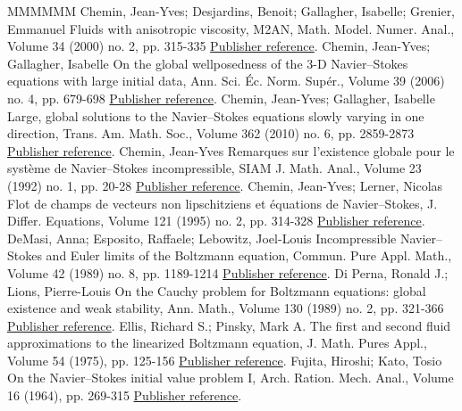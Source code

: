 \begin{thebibliography}{MMMMMM}
 Chemin, Jean-Yves; Desjardins, Benoit; Gallagher, Isabelle; Grenier, Emmanuel Fluids with anisotropic viscosity, M2AN, Math. Model. Numer. Anal., Volume 34 (2000) no. 2, pp. 315-335 \href{https://ahl.centre-mersenne.org/item/AHL_2020__3__561_0/#CDGG}{Publisher reference}.
 Chemin, Jean-Yves; Gallagher, Isabelle On the global wellposedness of the 3-D Navier–Stokes equations with large initial data, Ann. Sci. Éc. Norm. Supér., Volume 39 (2006) no. 4, pp. 679-698 \href{https://ahl.centre-mersenne.org/item/AHL_2020__3__561_0/#cg1}{Publisher reference}.
 Chemin, Jean-Yves; Gallagher, Isabelle Large, global solutions to the Navier–Stokes equations slowly varying in one direction, Trans. Am. Math. Soc., Volume 362 (2010) no. 6, pp. 2859-2873 \href{https://ahl.centre-mersenne.org/item/AHL_2020__3__561_0/#cg}{Publisher reference}.
 Chemin, Jean-Yves Remarques sur l’existence globale pour le système de Navier–Stokes incompressible, SIAM J. Math. Anal., Volume 23 (1992) no. 1, pp. 20-28 \href{https://ahl.centre-mersenne.org/item/AHL_2020__3__561_0/#cheminSIAM}{Publisher reference}.
 Chemin, Jean-Yves; Lerner, Nicolas Flot de champs de vecteurs non lipschitziens et équations de Navier–Stokes, J. Differ. Equations, Volume 121 (1995) no. 2, pp. 314-328 \href{https://ahl.centre-mersenne.org/item/AHL_2020__3__561_0/#cheminlerner}{Publisher reference}.
 DeMasi, Anna; Esposito, Raffaele; Lebowitz, Joel-Louis Incompressible Navier–Stokes and Euler limits of the Boltzmann equation, Commun. Pure Appl. Math., Volume 42 (1989) no. 8, pp. 1189-1214 \href{https://ahl.centre-mersenne.org/item/AHL_2020__3__561_0/#DeMasi-Esposito-Lebowitz}{Publisher reference}.
 Di Perna, Ronald J.; Lions, Pierre-Louis On the Cauchy problem for Boltzmann equations: global existence and weak stability, Ann. Math., Volume 130 (1989) no. 2, pp. 321-366 \href{https://ahl.centre-mersenne.org/item/AHL_2020__3__561_0/#DiPerna-Lions}{Publisher reference}.
 Ellis, Richard S.; Pinsky, Mark A. The first and second fluid approximations to the linearized Boltzmann equation, J. Math. Pures Appl., Volume 54 (1975), pp. 125-156 \href{https://ahl.centre-mersenne.org/item/AHL_2020__3__561_0/#Ellis-Pinsky}{Publisher reference}.
 Fujita, Hiroshi; Kato, Tosio On the Navier–Stokes initial value problem I, Arch. Ration. Mech. Anal., Volume 16 (1964), pp. 269-315 \href{https://ahl.centre-mersenne.org/item/AHL_2020__3__561_0/#fujitakato}{Publisher reference}.

\end{thebibliography}
